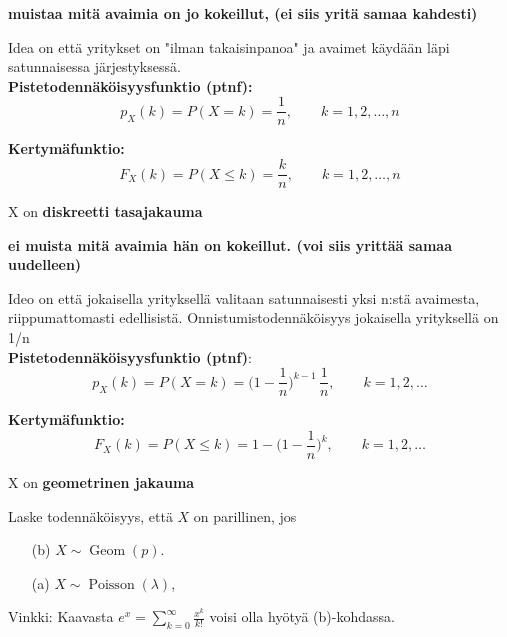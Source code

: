 \documentclass[12pt,a4paper]{article}
\begin{document}
\begin{kohta}
\item \textbf{muistaa mitä avaimia on jo kokeillut, (ei siis yritä samaa kahdesti)}

Idea on että yritykset on "ilman takaisinpanoa" ja avaimet
käydään läpi satunnaisessa järjestyksessä.\\

\textbf{Pistetodennäköisyysfunktio (ptnf):}
\[
p_X(k)=P(X=k)=\frac{1}{n},\qquad k=1,2,\dots,n
\]

\textbf{Kertymäfunktio:}
\[
F_X(k)=P(X\le k)=\frac{k}{n},\qquad k=1,2,\dots,n
\]



X on \textbf{diskreetti tasajakauma}
\item \textbf{ei muista mitä avaimia hän on kokeillut. (voi siis yrittää samaa uudelleen)}

Ideo on että jokaisella yrityksellä valitaan satunnaisesti yksi n:stä avaimesta, 
riippumattomasti edellisistä. Onnistumistodennäköisyys jokaisella
yrityksellä on 1/n\\

\textbf{Pistetodennäköisyysfunktio (ptnf)}:
\[
p_X(k)=P(X=k)=\Big(1-\frac{1}{n}\Big)^{k-1}\,\frac{1}{n},\qquad k=1,2,\dots
\]

\textbf{Kertymäfunktio:}
\[
F_X(k)=P(X\le k)=1-\Big(1-\frac{1}{n}\Big)^{k},\qquad k=1,2,\dots
\]


X on \textbf{geometrinen jakauma}
\end{kohta}







\pagebreak
{}
Laske todennäköisyys, että $X$ on parillinen, jos
\begin{enumerate}
\item[(b)] $X\sim\operatorname{Geom}(p)$.
\item[(a)] $X\sim\operatorname{Poisson}(\lambda)$,
\end{enumerate}
Vinkki: Kaavasta $e^x=\sum_{k=0}^\infty\frac{x^k}{k!}$ voisi olla hyötyä (b)-kohdassa.\\
\vspace{0.2cm}

\vspace{0.2cm}
\end{document}
